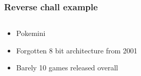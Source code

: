 \documentclass[aspectratio=169]{beamer}
\begin{document}
\begin{frame}
	\frametitle{Reverse chall example}
	\begin{columns}
		\begin{column}{0.65\textwidth}
			\begin{itemize}
				\item Pokemini
				\item Forgotten 8 bit architecture from 2001
				\item Barely 10 games released overall
			\end{itemize}
		\end{column}
		\begin{column}{0.35\textwidth}
		\end{column}
	\end{columns}
\end{frame}
\end{document}
